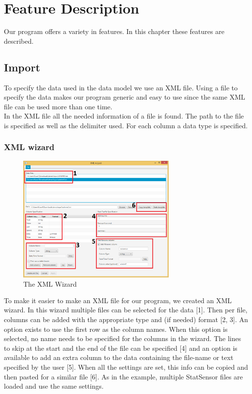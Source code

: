 \chapter{Feature Description}
Our program offers a variety in features. In this chapter these features are described.
\section{Import}
To specify the data used in the data model we use an XML file. Using a file to specify the data makes our program generic and easy to use since the same XML file can be used more than one time. \\
In the XML file all the needed information of a file is found. The path to the file is specified as well as the delimiter used. For each column a data type is specified. 
\subsection{XML wizard}
\begin{figure}[h!]
\centering
\includegraphics[width=300px]{chapters/image-featureDescription/xmlwizard-highlight.png}
\caption{The XML Wizard}
\end{figure}
To make it easier to make an XML file for our program, we created an XML wizard. In this wizard multiple files can be selected for the data [1]. Then per file, columns can be added with the appropriate type and (if needed) format [2, 3]. An option exists to use the first row as the column names. When this option is selected, no name needs to be specified for the columns in the wizard. The lines to skip at the start and the end of the file can be specified [4] and an option is available to add an extra column to the data containing the file-name or text specified by the user [5]. When all the settings are set, this info can be copied and then pasted for a similar file [6]. As in the example, multiple StatSensor files are loaded and use the same settings. 
